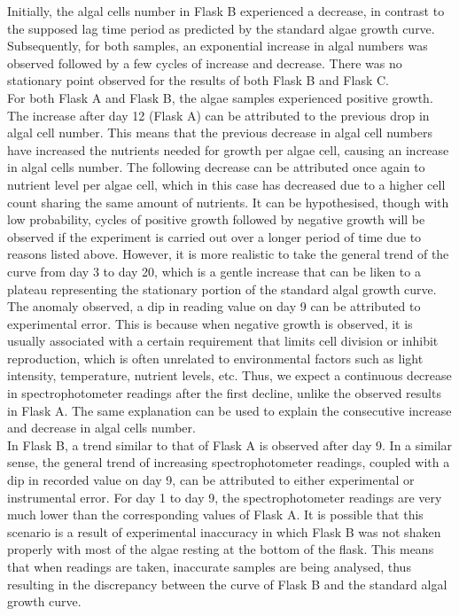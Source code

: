 \documentclass[12pt,a4paper]{IEEEtran}
\begin{document}
    Initially, the algal cells number in Flask B experienced a decrease, in contrast to the supposed lag time period as predicted by the standard algae growth curve. Subsequently, for both samples, an exponential
    increase in algal numbers was observed followed by a few cycles of increase and decrease. There was no stationary point observed for the results of both Flask B and Flask C. \\
    
    For both Flask A and Flask B, the algae samples experienced positive growth. \\
    
    The increase after day 12 (Flask A) can be attributed to the previous drop in algal cell number. This means that the previous decrease in algal cell numbers have increased the nutrients needed for growth per
    algae cell, causing an increase in algal cells number. The following decrease can be attributed once again to nutrient level per algae cell, which in this case has decreased due to a higher cell count sharing the same amount of nutrients. It can be hypothesised, though with low probability, cycles of positive growth followed by negative growth will be observed if the experiment is carried out over a longer period of time due to reasons listed above. However, it is more realistic to take the general trend of the curve from day 3 to day 20, which is a gentle increase that can be liken to a plateau representing the stationary portion of the standard algal growth curve. The anomaly observed, a dip in reading value on day 9 can be attributed to experimental error. This is because when negative growth is observed, it is usually associated with a certain requirement that limits cell division or inhibit reproduction, which is often unrelated to environmental factors such as light intensity, temperature, nutrient levels, etc. Thus, we expect a continuous decrease in spectrophotometer readings after the first decline, unlike the observed results in Flask A. The same explanation can be used to explain the consecutive increase and decrease in algal cells number. \\ 
    
    In Flask B, a trend similar to that of Flask A is observed after day 9. In a similar sense, the general trend of increasing spectrophotometer readings, coupled with a dip in recorded value on day 9, can be attributed to either experimental or instrumental error. For day 1 to day 9, the spectrophotometer readings are very much lower than the corresponding values of Flask A. It is possible that this scenario is a result of experimental inaccuracy in which Flask B was not shaken properly with most of the algae resting at the bottom of the flask. This means that when readings are taken, inaccurate samples are being analysed, thus resulting in the discrepancy between the curve of Flask B and the standard algal growth curve.
    
\end{document}
